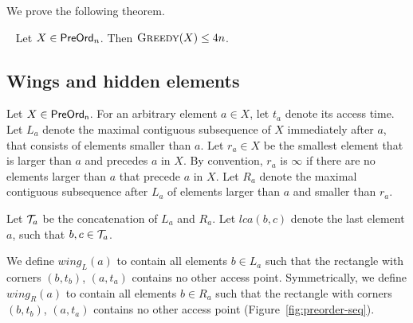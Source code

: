 We prove the following theorem.



\begin{theorem}~\label{thm:greedy-traversal}
Let $X \in {\sf PreOrd}_n$. Then $\mbox{{\sc Greedy}}(X) \leq 4n$.
\end{theorem}




\subsection{Wings and hidden elements}
\label{sec:wing-hidden}

  
Let $X \in {\sf PreOrd_n}$. For an arbitrary element $a \in X$, let $t_a$ denote its access time. Let $L_a$ denote the maximal contiguous subsequence of $X$ immediately after $a$, that consists of elements smaller than $a$. Let $r_a \in X$ be the smallest element that is larger than $a$ and precedes $a$ in $X$. By convention, $r_a$ is $\infty$ if there are no elements larger than $a$ that precede $a$ in $X$. Let $R_a$ denote the maximal contiguous subsequence after $L_a$ of elements larger than $a$ and smaller than $r_a$.



Let ${\mathcal T}_a$ be the concatenation of $L_a$ and $R_a$. Let $\textit{lca}(b,c)$ denote the last element $a$, such that $b,c \in {\mathcal T}_a$.

We define $wing_L(a)$ to contain all elements $b \in L_a$ such that the rectangle with corners $(b, t_b)$, $(a,t_a)$ contains no other access point. Symmetrically, we define $wing_R(a)$ to contain all elements $b \in R_a$ such that the rectangle with corners $(b, t_b)$, $(a,t_a)$ contains no other access point (Figure~\ref{fig:preorder-seq}).

